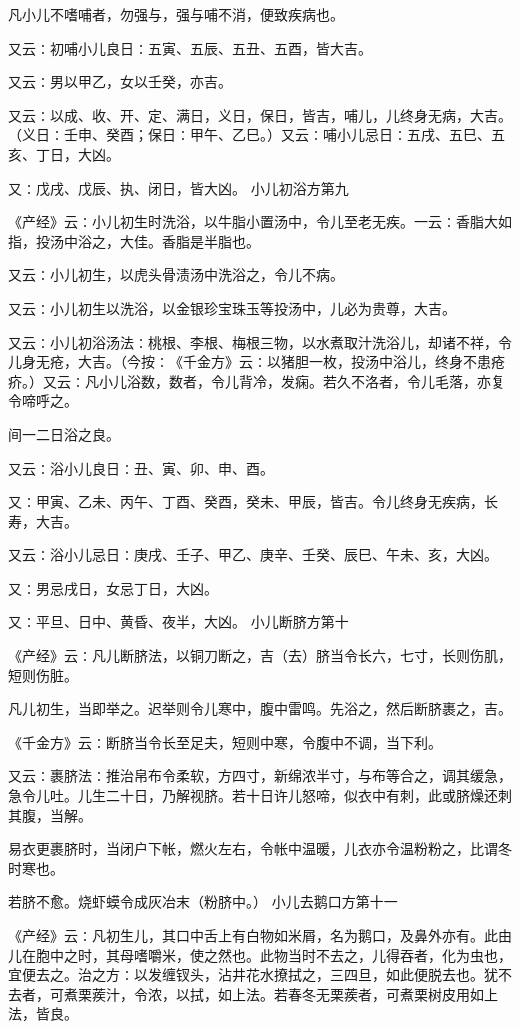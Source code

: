\documentclass[a4paper,12pt,UTF8,twoside]{ctexbook}
\begin{document}
凡小儿不嗜哺者，勿强与，强与哺不消，便致疾病也。

又云∶初哺小儿良日∶五寅、五辰、五丑、五酉，皆大吉。

又云∶男以甲乙，女以壬癸，亦吉。

又云∶以成、收、开、定、满日，义日，保日，皆吉，哺儿，儿终身无病，大吉。（义日∶壬申、癸酉；保日∶甲午、乙巳。）又云∶哺小儿忌日∶五戌、五巳、五亥、丁日，大凶。

又∶戊戌、戊辰、执、闭日，皆大凶。
小儿初浴方第九

《产经》云∶小儿初生时洗浴，以牛脂小置汤中，令儿至老无疾。一云∶香脂大如指，投汤中浴之，大佳。香脂是半脂也。

又云∶小儿初生，以虎头骨渍汤中洗浴之，令儿不病。

又云∶小儿初生以洗浴，以金银珍宝珠玉等投汤中，儿必为贵尊，大吉。

又云∶小儿初浴汤法∶桃根、李根、梅根三物，以水煮取汁洗浴儿，却诸不祥，令儿身无疮，大吉。（今按∶《千金方》云∶以猪胆一枚，投汤中浴儿，终身不患疮疥。）又云∶凡小儿浴数，数者，令儿背冷，发痫。若久不洛者，令儿毛落，亦复令啼呼之。

间一二日浴之良。

又云∶浴小儿良日∶丑、寅、卯、申、酉。

又∶甲寅、乙未、丙午、丁酉、癸酉，癸未、甲辰，皆吉。令儿终身无疾病，长寿，大吉。

又云∶浴小儿忌日∶庚戌、壬子、甲乙、庚辛、壬癸、辰巳、午未、亥，大凶。

又∶男忌戌日，女忌丁日，大凶。

又∶平旦、日中、黄昏、夜半，大凶。
小儿断脐方第十

《产经》云∶凡儿断脐法，以铜刀断之，吉（去）脐当令长六，七寸，长则伤肌，短则伤脏。

凡儿初生，当即举之。迟举则令儿寒中，腹中雷鸣。先浴之，然后断脐裹之，吉。

《千金方》云∶断脐当令长至足夫，短则中寒，令腹中不调，当下利。

又云∶裹脐法∶推治帛布令柔软，方四寸，新绵浓半寸，与布等合之，调其缓急，急令儿吐。儿生二十日，乃解视脐。若十日许儿怒啼，似衣中有刺，此或脐燥还刺其腹，当解。

易衣更裹脐时，当闭户下帐，燃火左右，令帐中温暖，儿衣亦令温粉粉之，比谓冬时寒也。

若脐不愈。烧虾蟆令成灰冶末（粉脐中。）
小儿去鹅口方第十一

《产经》云∶凡初生儿，其口中舌上有白物如米屑，名为鹅口，及鼻外亦有。此由儿在胞中之时，其母嗜嚼米，使之然也。此物当时不去之，儿得吞者，化为虫也，宜便去之。治之方∶以发缠钗头，沾井花水撩拭之，三四旦，如此便脱去也。犹不去者，可煮栗蒺汁，令浓，以拭，如上法。若春冬无栗蒺者，可煮栗树皮用如上法，皆良。
\end{document}
